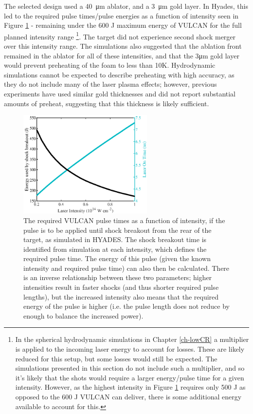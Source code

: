 The selected design used a 40~\unit{\micro\meter} ablator, and a 3~\unit{\micro\meter} gold layer. In Hyades, this led to the required pulse times/pulse energies as a function of intensity seen in Figure \ref{fig:VULCAN energy} - remaining under the 600 J maximum energy of VULCAN for the full planned intensity range \footnote{In the spherical hydrodynamic simulations in Chapter \ref{ch-lowCR} a multiplier is applied to the incoming laser energy to account for losses. These are likely reduced for this setup, but some losses would still be expected. The simulations presented in this section do not include such a multiplier, and so it's likely that the shots would require a larger energy/pulse time for a given intensity. However, as the highest intensity in Figure \ref{fig:VULCAN energy} requires only 500 J as opposed to the 600 J VULCAN can deliver, there is some additional energy available to account for this. }. The target did not experience second shock merger over this intensity range. The simulations also suggested that the ablation front remained in the ablator for all of these intensities, and that the 3\unit{\micro\meter} gold layer would prevent preheating of the foam to less than 10K. Hydrodynamic simulations cannot be expected to describe preheating with high accuracy, as they do not include many of the laser plasma effects; however, previous experiments have used similar gold thicknesses and did not report substantial amounts of preheat, suggesting that this thickness is likely sufficient.


\begin{figure}[hbt!]
\centering
\includegraphics[width=0.6\textwidth]{figures/Experiment/EnergyandPulsetimes_edit.eps}%
\caption{\label{fig:VULCAN energy} The required VULCAN pulse times as a function of intensity, if the pulse is to be applied until shock breakout from the rear of the target, as simulated in HYADES. The shock breakout time is identified from simulation at each intensity, which defines the required pulse time. The energy of this pulse (given the known intensity and required pulse time) can also then be calculated. There is an inverse relationship between these two parameters; higher intensities result in faster shocks (and thus shorter required pulse lengths), but the increased intensity also means that the required energy of the pulse is higher (i.e. the pulse length does not reduce by enough to balance the increased power).}
\end{figure}

